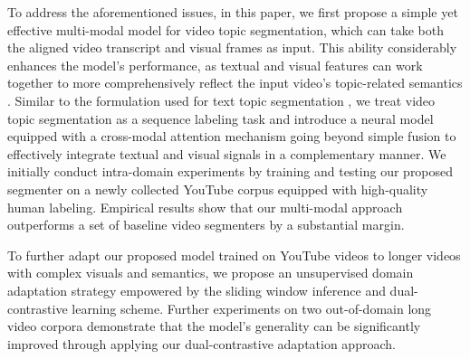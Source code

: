 \documentclass[runningheads]{llncs}
\begin{document}
To address the aforementioned issues, in this paper, we first propose a simple yet effective multi-modal model for video topic segmentation, which can take both the aligned video transcript and visual frames as input. This ability considerably enhances the model's performance, as textual and visual features can work together to more comprehensively reflect the input video's topic-related semantics \cite{nicolas-etal-combining-2011,Lorenzo-etal-2015}. 
Similar to the formulation used for text topic segmentation \cite{koshorek-etal-2018-text,xing-etal-2020-improving,lo-etal-2021-transformer-pre}, we treat video topic segmentation as a sequence labeling task and introduce a neural model equipped with a cross-modal attention mechanism going beyond simple fusion to effectively integrate textual and visual signals in a complementary manner.
We initially conduct intra-domain experiments by training and testing our proposed segmenter on a newly collected YouTube corpus equipped with high-quality human labeling.
Empirical results show that our multi-modal approach outperforms a set of baseline video segmenters by a substantial margin.


To further adapt our proposed model trained on YouTube videos to longer videos with complex visuals and semantics, we propose an unsupervised domain adaptation strategy empowered by the sliding window inference and dual-contrastive learning scheme. %
Further experiments on two out-of-domain long video corpora demonstrate that the model's generality can be significantly improved 
through applying our dual-contrastive adaptation approach.
\end{document}

